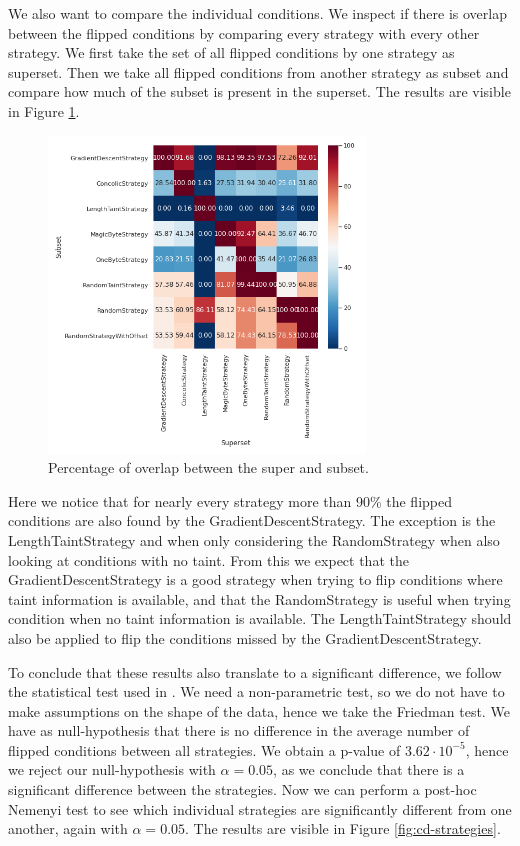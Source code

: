 We also want to compare the individual conditions. We inspect if there is overlap between the flipped conditions by comparing every strategy with every other strategy. We first take the set of all flipped conditions by one strategy as superset. Then we take all flipped conditions from another strategy as subset and compare how much of the subset is present in the superset. The results are visible in Figure \ref{fig:overlap-strategies}.

\begin{figure}[H]
    \centering
    \includegraphics[width=0.75\textwidth]{5_results/graphs_new/overlap_strategies.png}  
    \caption{Percentage of overlap between the super and subset.}
    \label{fig:overlap-strategies}
\end{figure}

Here we notice that for nearly every strategy more than 90\% the flipped conditions are also found by the GradientDescentStrategy. The exception is the LengthTaintStrategy and when only considering the RandomStrategy when also looking at conditions with no taint. From this we expect that the GradientDescentStrategy is a good strategy when trying to flip conditions where taint information is available, and that the RandomStrategy is useful when trying condition when no taint information is available. The LengthTaintStrategy should also be applied to flip the conditions missed by the GradientDescentStrategy.

To conclude that these results also translate to a significant difference, we follow the statistical test used in \cite{metzman2020fuzzbench, demvsar2006statistical}. We need a non-parametric test, so we do not have to make assumptions on the shape of the data, hence we take the Friedman test. 
We have as null-hypothesis that there is no difference in the average number of flipped conditions between all strategies. We obtain a p-value of $3.62 \cdot 10^{-5}$, hence we reject our null-hypothesis with $\alpha = 0.05$, as we conclude that there is a significant difference between the strategies. Now we can perform a post-hoc Nemenyi test to see which individual strategies are significantly different from one another, again with  $\alpha = 0.05$.
The results are visible in Figure \ref{fig:cd-strategies}.

